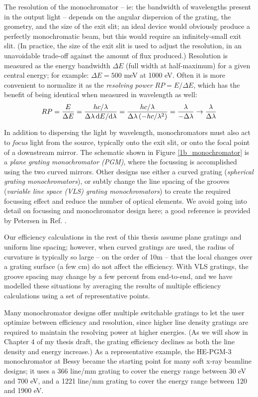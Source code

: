 The resolution of the monochromator  -- ie: the bandwidth of wavelengths present in the output light -- depends on the angular dispersion of the grating, the geometry, and the size of the exit slit; an ideal device would obviously produce a perfectly monochromatic beam, but this would require an infinitely-small exit slit.  (In practice, the size of the exit slit is used to adjust the resolution, in an unavoidable trade-off against the amount of flux produced.)  Resolution is measured as the energy bandwidth $\Delta E$ (full width at half-maximum) for a given central energy; for example: $\Delta E = 500$ meV at 1000 eV.   Often it is more convenient to normalize it as the \emph{resolving power} $RP = E/\Delta E$, which has the benefit of being identical when measured in wavelength as well:
\begin{eqnarray}
RP = \frac{E}{\Delta E} = \frac{hc/\lambda}{\Delta \lambda \, \mathrm{d} E/\mathrm{d} \lambda} = \frac{hc/\lambda}{\Delta \lambda\, (-hc / \lambda^2)} =  \frac{\lambda}{-\Delta \lambda} \rightarrow \frac{\lambda}{\Delta \lambda}
\end{eqnarray}

In addition to dispersing the light by wavelength, monochromators must also act to \emph{focus} light from the source, typically onto the exit slit, or onto the focal point of a downstream mirror.  The schematic shown in Figure \ref{1b_monochromator} is a \emph{plane grating monochromator (PGM)}, where the focussing is accomplished using the two curved mirrors.  Other designs use either a curved grating (\emph{spherical grating monochromators}), or subtly change the line spacing of the grooves (\emph{variable line space (VLS) grating monochromators}) to create the required focussing effect and reduce the number of optical elements.  We avoid going into detail on focussing and monochromator design here; a good reference is provided by Petersen in Ref. \cite{Pea97}.

Our efficiency calculations in the rest of this thesis assume plane gratings and uniform line spacing; however, when curved gratings are used, the radius of curvature is typically so large  -- on the order of 10m -- that the local changes over a grating surface (a few cm) do not affect the efficiency.  With VLS gratings, the groove spacing may change by a few percent from end-to-end, and we have modelled these situations by averaging the results of multiple efficiency calculations using a set of representative points.

Many monochromator designs offer multiple switchable gratings to let the user optimize between efficiency and resolution, since higher line density gratings are required to maintain the resolving power at higher energies.  (As we will show in Chapter 4 of my thesis draft, the grating efficiency declines as both the line density and energy increase.)  As a representative example, the HE-PGM-3 monochromator at Bessy \cite{Pet95} became the starting point for many soft x-ray beamline designs; it uses a 366 line/mm grating to cover the energy range between 30 eV and 700 eV, and a 1221 line/mm grating to cover the energy range between 120 and 1900 eV.

